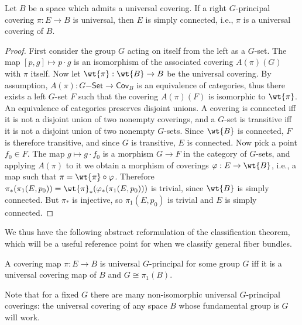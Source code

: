\begin{prop}
    Let $B$ be a space which admits a universal covering. If a right $G$-principal covering  $\pi:E\to B$ is universal, then $E$ is simply connected, i.e., $\pi$ is a universal covering of $B$.
\end{prop}
\begin{proof}
    First consider the group $G$ acting on itself from the left as a $G$-set. The map $[p,g]\mapsto p\cdot g$ is an isomorphism of the associated covering $A(\pi)(G)$ with $\pi$ itself. Now let $\wt{\pi}:\wt{B}\to B$ be the universal covering. By assumption, $A(\pi):G\mathsf{-Set}\to \mathsf{Cov}_B$ is an equivalence of categories, thus there exists a left $G$-set $F$ such that the covering $A(\pi)(F)$ is isomorphic to $\wt{\pi}$. An equivalence of categories preserves disjoint unions. A covering is connected iff it is not a disjoint union of two nonempty coverings, and a $G$-set is transitive iff it is not a disjoint union of two nonempty $G$-sets. Since $\wt{B}$ is connected, $F$ is therefore transitive, and since $G$ is transitive, $E$ is connected. Now pick a point $f_0\in F$. The map $g\mapsto g\cdot f_0$ is a morphism $G\to F$ in the category of $G$-sets, and applying $A(\pi)$ to it we obtain a morphism of coverings $\varphi:E\to \wt{B}$, i.e., a map such that $\pi=\wt{\pi}\circ\varphi$. Therefore $\pi_\ast(\pi_1(E,p_0))=\wt{\pi}_\ast(\varphi_\ast(\pi_1(E,p_0)))$ is trivial, since $\wt{B}$ is simply connected. But $\pi_\ast$ is injective, so $\pi_1(E,p_0)$ is trivial and $E$ is simply connected.
\end{proof}

We thus have the following abstract reformulation of the classification theorem, which will be a useful reference point for when we classify general fiber bundles.

\begin{thm}
    A covering map $\pi:E\to B$ is universal $G$-principal for some group $G$ iff it is a universal covering map of $B$ and $G\cong \pi_1(B)$.
\end{thm}
Note that for a fixed $G$ there are many non-isomorphic universal $G$-principal coverings: the universal covering of any space $B$ whose fundamental group is $G$ will work. 


